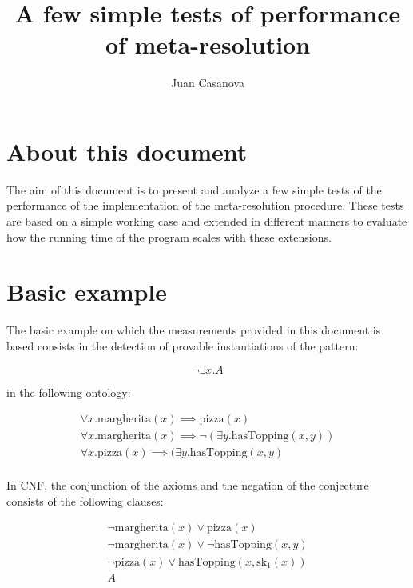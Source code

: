\documentclass[12pt,a4paper]{article}
\title{A few simple tests of performance of meta-resolution}
\author{Juan Casanova}
\begin{document}
\maketitle

\section{About this document}

The aim of this document is to present and analyze a few simple tests of the performance of the implementation of the meta-resolution procedure. These tests are based on a simple working case and extended in different manners to evaluate how the running time of the program scales with these extensions.

\section{Basic example}

The basic example on which the measurements provided in this document is based consists in the detection of provable instantiations of the pattern:

\begin{equation}
\neg \exists x. A
\end{equation}

\noindent in the following ontology:

\begin{equation}
\begin{array}{l}
\forall x. \text{margherita}(x) \implies \text{pizza}(x)\\
\forall x. \text{margherita}(x) \implies \neg (\exists y. \text{hasTopping}(x,y))\\
\forall x. \text{pizza}(x) \implies (\exists y. \text{hasTopping}(x,y)\\
\end{array}
\end{equation}

In CNF, the conjunction of the axioms and the negation of the conjecture consists of the following clauses:

\begin{equation}
\begin{array}{l}
\neg \text{margherita}(x) \lor \text{pizza}(x)\\
\neg \text{margherita}(x) \lor \neg \text{hasTopping}(x,y)\\
\neg \text{pizza}(x) \lor \text{hasTopping}(x,\text{sk}_1(x))\\
A
\end{array}
\end{equation}
\end{document}
